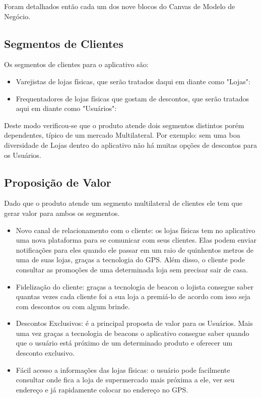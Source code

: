 Foram detalhados então cada um dos nove blocos do Canvas de Modelo de Negócio.
\subsection{Segmentos de Clientes}
\label{cha:segmentos_de_clientes}
Os segmentos de clientes para o aplicativo são:
\begin{itemize}
\item Varejistas de lojas físicas, que serão tratados daqui em diante como "Lojas": 
\item Frequentadores de lojas físicas que gostam de descontos, que serão tratados aqui em diante como "Usuários": 
\end{itemize}
Deste modo verificou-se que o produto atende dois segmentos distintos porém dependentes, típico de um mercado Multilateral. Por exemplo: sem uma boa diversidade de Lojas dentro do aplicativo não há muitas opções de descontos para os Usuários.

\subsection{Proposição de Valor}
\label{cha:proposicao_de_valor}
Dado que o produto atende um segmento multilateral de clientes ele tem que gerar valor para ambos os segmentos.
\begin{itemize}
\item Novo canal de relacionamento com o cliente: os lojas físicas tem no aplicativo uma nova plataforma para se comunicar com seus clientes. Elas podem enviar notificações para eles quando ele passar em um raio de quinhentos metros de uma de suas lojas, graças a tecnologia do GPS. Além disso, o cliente pode consultar as promoções de uma determinada loja sem precisar sair de casa.
\item Fidelização do cliente: graças a tecnologia de beacon o lojista consegue saber quantas vezes cada cliente foi a sua loja a premiá-lo de acordo com isso seja com descontos ou com algum brinde.
\item Descontos Exclusivos: é a principal proposta de valor para os Usuários. Mais uma vez graças a tecnologia de beacons o aplicativo consegue saber quando que o usuário está próximo de um determinado produto e oferecer um desconto exclusivo.
\item Fácil acesso a informações das lojas físicas: o usuário pode facilmente consultar onde fica a loja de supermercado mais próxima a ele, ver seu endereço e já rapidamente colocar no endereço no GPS.
\end{itemize}

